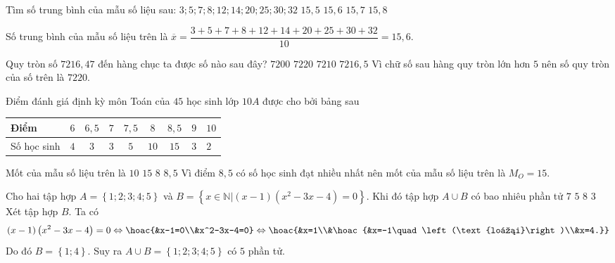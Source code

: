 	\begin{ex}%
		Tìm số trung bình của mẫu số liệu sau: $3; 5; 7; 8; 12; 14; 20; 25; 30; 32$
		\choice
		{$15{,}5$}
		{\True $15{,}6$}
		{$15{,}7$}
		{$15{,}8$}
		\loigiai
		{Số trung bình của mẫu số liệu trên là $\overline{x}=\dfrac{3+5+7+8+12+14+20+25+30+32}{10}=15{,}6$.
			
		}
	\end{ex}
	
	\begin{ex}%
		Quy tròn số $7216{,}47$ đến hàng chục ta được số nào sau đây?
		\choice
		{$7200$}
		{\True $7220$}
		{$7210$}
		{$7216{,}5$}
		\loigiai
		{Vì chữ số sau hàng quy tròn lớn hơn $5$ nên số quy tròn của số trên là $7220$.
		}
	\end{ex}
	
	\begin{ex}%
		Điểm đánh giá định kỳ môn Toán của $45$ học sinh lớp $10A$ được cho bởi bảng sau
		\begin{center}
			\begin{tabular}{|l|c|c|c|c|c|c|c|l|}
				\hline Điểm & $6$ & $6,5$ & $7$ & $7,5$ & $8$ & $8,5$ & $9$ & $10$ \\
				\hline Số học sinh & $4$ & $3$ & $3$ & $5$ & $10$ & $15$ & $3$ & $2$\\
				\hline
			\end{tabular}
		\end{center}
		Mốt của mẫu số liệu trên là
		\choice
		{$10$}
		{\True $15$}
		{$8$}
		{$8{,}5$}
		\loigiai
		{Vì điểm $8{,}5$ có số học sinh đạt nhiều nhất nên mốt của mẫu số liệu trên là $M_O=15$.
		}
	\end{ex}

\begin{ex}%
	Cho hai tập hợp $A = \left\{1;2;3;4;5\right\}$ và $B = \left\{x\in\mathbb{N}\Big|\left(x-1\right)\left(x^2-3x-4\right) = 0\right\}$. Khi đó tập hợp $A\cup B$ có bao nhiêu phần tử
	\choice
	{$7$}
	{\True $5$}
	{$8$}
	{$3$}
	\loigiai
	{
		Xét tập hợp $B$. Ta có \[\left(x-1\right)\left(x^2-3x-4\right) = 0 \Leftrightarrow\hoac{&x-1=0\\&x^2-3x-4=0}\Leftrightarrow \hoac{&x=1\\&\hoac{&x=-1\quad\left(\text{loại}\right)\\&x=4.}}\]
		Do đó $B = \left\{1;4\right\}$. Suy ra $A\cup B = \left\{1;2;3;4;5\right\}$ có $5$ phần tử.
	}
\end{ex}

